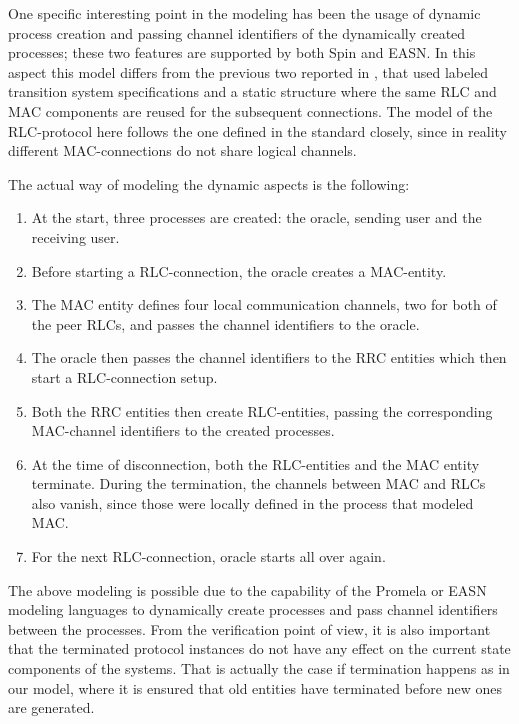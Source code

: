 \documentclass{entcs} \usepackage{entcsmacro}
\begin{document}
One specific interesting point in the modeling has been the usage of
dynamic process creation and passing channel identifiers of the
dynamically created processes; these two features are supported by
both Spin and EASN. In this aspect this model differs from the
previous two reported in \cite{DSVV2000}, \cite{ICACSD} that used
labeled transition system specifications and a static structure where
the same RLC and MAC components are reused for the subsequent
connections.  The model of the RLC-protocol here follows the one
defined in the standard closely, since in reality different
MAC-connections do not share logical channels.

The actual way of modeling the dynamic aspects is the following:
\begin{enumerate}
\item At the start, three processes are created: the oracle, sending
      user and the receiving user.
\item Before starting a RLC-connection, the oracle creates a MAC-entity.
\item The MAC entity defines four local communication channels, two for both
        of the peer RLCs, and passes the channel identifiers to the oracle.
\item The oracle then passes the channel identifiers to the RRC entities which
       then start a RLC-connection setup.
\item Both the RRC entities then create RLC-entities, passing the
      corresponding MAC-channel identifiers to the created processes.
\item At the time of disconnection, both the RLC-entities and
       the MAC entity terminate. During the termination, the channels
        between MAC and RLCs  also vanish, since those were locally
        defined in the process that modeled MAC.
\item For the next RLC-connection, oracle starts all over again.
\end{enumerate}

The above modeling is possible due to the capability of the Promela or
EASN modeling languages to dynamically
create processes and pass channel identifiers between the processes.
From the verification point of view, it is also important that the terminated
protocol instances do not have any effect on the current state components of
the systems. That is actually the case if termination happens as in our model, 
where it is ensured that old entities have terminated
before new ones are generated.
 
\end{document}
